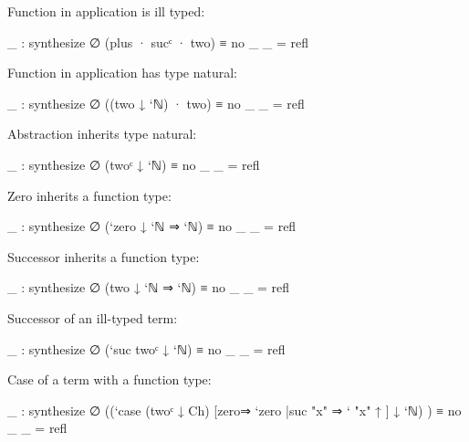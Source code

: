 Function in application is ill typed:

\begin{fence}
\begin{code}
_ : synthesize ∅ (plus · sucᶜ · two) ≡ no _
_ = refl
\end{code}
\end{fence}

Function in application has type natural:

\begin{fence}
\begin{code}
_ : synthesize ∅ ((two ↓ `ℕ) · two) ≡ no _
_ = refl
\end{code}
\end{fence}

Abstraction inherits type natural:

\begin{fence}
\begin{code}
_ : synthesize ∅ (twoᶜ ↓ `ℕ) ≡ no _
_ = refl
\end{code}
\end{fence}

Zero inherits a function type:

\begin{fence}
\begin{code}
_ : synthesize ∅ (`zero ↓ `ℕ ⇒ `ℕ) ≡ no _
_ = refl
\end{code}
\end{fence}

Successor inherits a function type:

\begin{fence}
\begin{code}
_ : synthesize ∅ (two ↓ `ℕ ⇒ `ℕ) ≡ no _
_ = refl
\end{code}
\end{fence}

Successor of an ill-typed term:

\begin{fence}
\begin{code}
_ : synthesize ∅ (`suc twoᶜ ↓ `ℕ) ≡ no _
_ = refl
\end{code}
\end{fence}

Case of a term with a function type:

\begin{fence}
\begin{code}
_ : synthesize ∅
      ((`case (twoᶜ ↓ Ch) [zero⇒ `zero |suc "x" ⇒ ` "x" ↑ ] ↓ `ℕ) ) ≡ no _
_ = refl
\end{code}
\end{fence}

